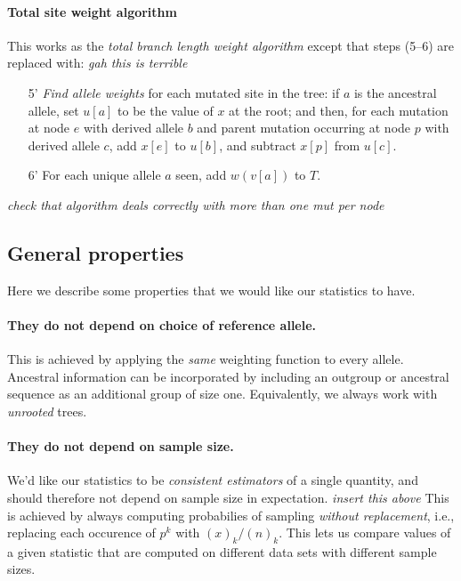 \documentclass{article}
\newcommand{\plr}[1]{{\color{blue} \it #1}}
\begin{document}
\paragraph{Total site weight algorithm}
This works as the \emph{total branch length weight algorithm} except that steps (5--6) are replaced with:
\plr{gah this is terrible}
\begin{itemize}
    \item[5'] \emph{Find allele weights} for each mutated site in the tree:
        if $a$ is the ancestral allele,
        set $u[a]$ to be the value of $x$ at the root; and then,
        for each mutation at node $e$ with derived allele $b$ 
        and parent mutation occurring at node $p$ with derived allele $c$,
        add $x[e]$ to $u[b]$, and subtract $x[p]$ from $u[c]$.
    \item[6'] For each unique allele $a$ seen,
        add $w(v[a])$ to $T$.
\end{itemize}
\plr{check that algorithm deals correctly with more than one mut per node}

\subsection*{General properties}

Here we describe some properties that we would like our statistics to have.

\paragraph{They do not depend on choice of reference allele.}
This is achieved by applying the \emph{same} weighting function to every allele.
Ancestral information can be incorporated by including an outgroup or ancestral sequence
as an additional group of size one.
Equivalently, we always work with \emph{unrooted} trees.

\paragraph{They do not depend on sample size.}
We'd like our statistics to be \emph{consistent estimators}
of a single quantity, and should therefore not depend on sample size in expectation.
\plr{insert this above}
This is achieved by always computing probabilies of sampling \emph{without replacement},
i.e., replacing each occurence of $p^k$ with $(x)_k/(n)_k$.
This lets us compare values of a given statistic
that are computed on different data sets with different sample sizes.
\end{document}
